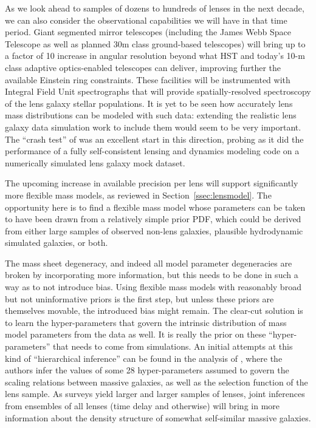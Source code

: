 As we look ahead to samples of dozens to hundreds of lenses in the
next decade, we can also consider the observational capabilities we
will have in that time period. Giant segmented mirror telescopes
(including the James Webb Space Telescope as well as planned 30m class
ground-based telescopes) will bring up to a factor of 10 increase in
angular resolution beyond what HST and today's 10-m class adaptive
optics-enabled telescopes can deliver, improving further the available
Einstein ring constraints. These facilities will be instrumented with
Integral Field Unit spectrographs that will provide
spatially-resolved spectroscopy of the lens galaxy stellar populations.
It is yet to be seen how accurately lens mass distributions can be
modeled with such data: extending the realistic lens galaxy data
simulation work to include them would seem to be very important. The
``crash test'' of \citet{Bar++09a} was an excellent start in this
direction, probing as it did the performance of a fully self-consistent
lensing and dynamics modeling code on a numerically simulated lens
galaxy mock dataset.

The upcoming increase in available precision per lens will support
significantly more flexible mass models, as reviewed in
Section~\ref{ssec:lensmodel}.
The opportunity here is to find a flexible mass model whose parameters
can be taken to have been drawn from a relatively simple prior PDF,
which could be derived from either large samples of observed non-lens
galaxies, plausible hydrodynamic simulated galaxies, or both.


The mass sheet degeneracy, and indeed all model parameter degeneracies
are broken by incorporating more information, but this needs to be
done in such a way as to not introduce bias. Using flexible mass
models with reasonably broad but not uninformative priors is the first
step, but unless these priors are themselves movable, the introduced
bias might remain. The clear-cut solution is to learn the
hyper-parameters that govern the intrinsic distribution of mass model
parameters from the data as well. It is really the prior on these
``hyper-parameters'' that needs to come from simulations. An initial
attempts at this kind of ``hierarchical inference'' can be found in
the analysis of \citet{SonnenfeldEtal2015}, where the authors infer
the values of some 28 hyper-parameters assumed to govern the scaling
relations between massive galaxies, as well as the selection function
of the lens sample. As surveys yield larger and larger samples of
lenses, joint inferences from ensembles
of all lenses (time delay and otherwise) will bring in more
information about the density structure of somewhat self-similar
massive galaxies.

